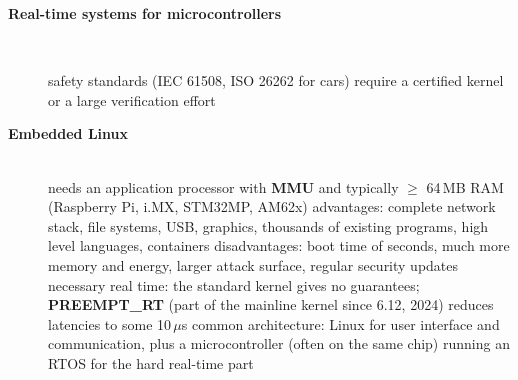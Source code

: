 \begin{description}
\item[{\rot\bf Real-time systems for microcontrollers}]~\\[-\lblskip]
\begin{center}
\end{center}
\bi
	\ite safety standards (IEC 61508, ISO 26262 for cars) require a certified kernel or a large verification effort
\ei
\os{\newpage}

\item[{\rot\bf Embedded Linux}]~\\[-\lblskip]
\bi
	\ite needs an application processor with \textbf{MMU} and typically $\ge$ 64\,MB RAM (Raspberry Pi, i.MX, STM32MP, AM62x)
	\ite advantages: complete network stack, file systems, USB, graphics, thousands of existing programs, high level languages, containers
	\ite disadvantages: boot time of seconds, much more memory and energy, larger attack surface, regular security updates necessary
	\ite real time: the standard kernel gives no guarantees; \textbf{PREEMPT\_RT} (part of the mainline kernel since 6.12, 2024) reduces latencies to some 10\,$\mu$s
	\ite common architecture: Linux for user interface and communication, plus a microcontroller (often on the same chip) running an RTOS for the hard real-time part
\ei
\os{\newpage}


\end{description}
